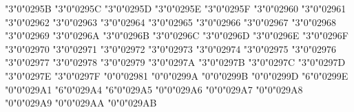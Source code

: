 \mchardef\barrightharpoonup"3"0"0295B
\mchardef\upharpoonrightbar"3"0"0295C
\mchardef\bardownharpoonright"3"0"0295D
\mchardef\leftharpoondownbar"3"0"0295E
\mchardef\barrightharpoondown"3"0"0295F
\mchardef\upharpoonleftbar"3"0"02960
\mchardef\bardownharpoonleft"3"0"02961
\mchardef\leftharpoonsupdown"3"0"02962
\mchardef\upharpoonsleftright"3"0"02963
\mchardef\rightharpoonsupdown"3"0"02964
\mchardef\downharpoonsleftright"3"0"02965
\mchardef\leftrightharpoonsup"3"0"02966
\mchardef\leftrightharpoonsdown"3"0"02967
\mchardef\rightleftharpoonsup"3"0"02968
\mchardef\rightleftharpoonsdown"3"0"02969
\mchardef\leftharpoonupdash"3"0"0296A
\mchardef\dashleftharpoondown"3"0"0296B
\mchardef\rightharpoonupdash"3"0"0296C
\mchardef\dashrightharpoondown"3"0"0296D
\mchardef\updownharpoonsleftright"3"0"0296E
\mchardef\downupharpoonsleftright"3"0"0296F
\mchardef\rightimply"3"0"02970
\mchardef\equalrightarrow"3"0"02971
\mchardef\similarrightarrow"3"0"02972
\mchardef\leftarrowsimilar"3"0"02973
\mchardef\rightarrowsimilar"3"0"02974
\mchardef\rightarrowapprox"3"0"02975
\mchardef\ltlarr"3"0"02976
\mchardef\leftarrowless"3"0"02977
\mchardef\gtrarr"3"0"02978
\mchardef\subrarr"3"0"02979
\mchardef\leftarrowsubset"3"0"0297A
\mchardef\suplarr"3"0"0297B
\mchardef\leftfishtail"3"0"0297C
\mchardef\rightfishtail"3"0"0297D
\mchardef\upfishtail"3"0"0297E
\mchardef\downfishtail"3"0"0297F
\mchardef\mdsmblkcircle"0"0"02981
\def\typecolon{\delim"0"0"02982 }
\def\lBrace{\delim"4"0"02983 }
\def\rBrace{\delim"5"0"02984 }
\def\lParen{\delim"4"0"02985 }
\def\rParen{\delim"5"0"02986 }
\def\llparenthesis{\delim"4"0"02987 }
\def\rrparenthesis{\delim"5"0"02988 }
\def\llangle{\delim"4"0"02989 }
\def\rrangle{\delim"5"0"0298A }
\def\lbrackubar{\delim"0"0"0298B }
\def\rbrackubar{\delim"0"0"0298C }
\def\lbrackultick{\delim"0"0"0298D }
\def\rbracklrtick{\delim"0"0"0298E }
\def\lbracklltick{\delim"0"0"0298F }
\def\rbrackurtick{\delim"0"0"02990 }
\def\langledot{\delim"0"0"02991 }
\def\rangledot{\delim"0"0"02992 }
\def\lparenless{\delim"4"0"02993 }
\def\rparengtr{\delim"5"0"02994 }
\def\Lparengtr{\delim"0"0"02995 }
\def\Rparenless{\delim"0"0"02996 }
\def\lblkbrbrak{\delim"0"0"02997 }
\def\rblkbrbrak{\delim"0"0"02998 }
\mchardef\vzigzag"0"0"0299A
\mchardef\measuredangleleft"0"0"0299B
\mchardef\rightanglemdot"0"0"0299D
\mchardef\angles"6"0"0299E
\mchardef\sphericalangleup"0"0"029A1
\mchardef\angleubar"6"0"029A4
\mchardef\revangleubar"6"0"029A5
\mchardef\wideangledown"0"0"029A6
\mchardef\wideangleup"0"0"029A7
\mchardef\measanglerutone"0"0"029A8
\mchardef\measanglelutonw"0"0"029A9
\mchardef\measanglerdtose"0"0"029AA
\mchardef\measangleldtosw"0"0"029AB
